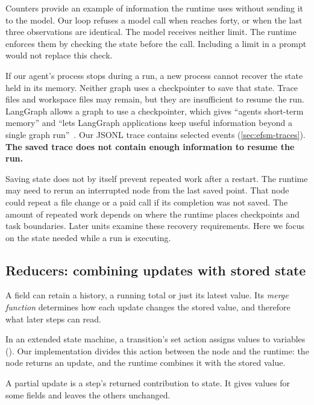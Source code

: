 Counters provide an example of information the runtime uses without sending it to the model.
Our loop refuses a model call when  reaches forty, or when the last three
observations are identical. The model receives neither limit. The runtime enforces them by
checking the state before the call. Including a limit in a prompt would not replace this check.

If our agent's process stops during a run, a new process cannot recover the state held in its
memory. Neither graph uses a checkpointer to save that state. Trace files and workspace files
may remain, but they are insufficient to resume the run. LangGraph allows a graph to use a
checkpointer, which gives ``agents short-term
memory'' and ``lets LangGraph applications keep useful information beyond a single graph
run''~\citep{langgraph-persistence}. Our JSONL trace contains selected events
(\cref{sec:efsm-traces}). \textbf{The saved trace does not contain enough information to resume
the run.}

Saving state does not by itself prevent repeated work after a restart. The runtime may need to
rerun an interrupted node from the last saved point. That node could repeat a file change or a
paid call if its completion was not saved. The amount of repeated work depends on where the
runtime places checkpoints and task boundaries. Later units examine these recovery requirements.
Here we focus on the state needed while a run is executing.

\subsection{Reducers: combining updates with stored state}
\label{sec:state-reducers}

A field can retain a history, a running total or just its latest value. Its \emph{merge function}
determines how each update changes the stored value, and therefore what later steps can read.

In an extended state machine, a transition's set action assigns values to variables
(\citealp[slide~5]{seshia2015extended}). Our implementation divides this action between the node
and the runtime: the node returns an update, and the runtime combines it with the stored value.

\begin{definition}
\label{def:partial-update}
A partial update is a step's returned contribution to state. It gives values for some fields
and leaves the others unchanged.
\end{definition}

